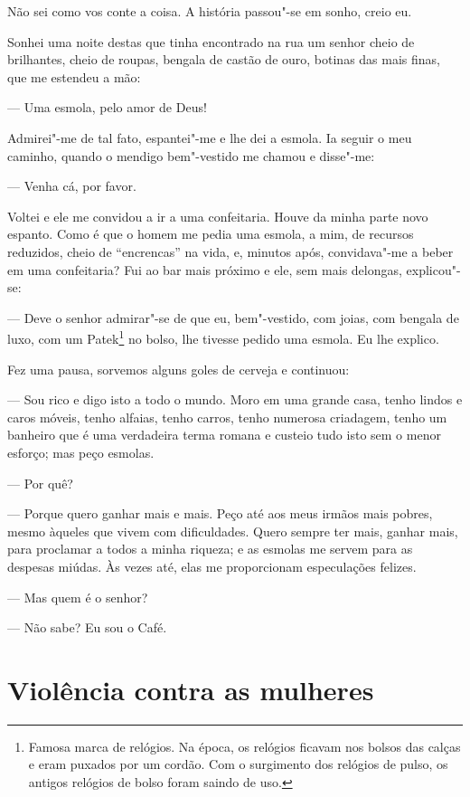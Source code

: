 Não sei como vos conte a coisa. A história passou"-se em sonho, creio eu.

Sonhei uma noite destas que tinha encontrado na rua um senhor cheio de
brilhantes, cheio de roupas, bengala de castão de ouro, botinas das mais
finas, que me estendeu a mão:

--- Uma esmola, pelo amor de Deus!

Admirei"-me de tal fato, espantei"-me e lhe dei a esmola. Ia seguir o meu
caminho, quando o mendigo bem"-vestido me chamou e disse"-me:

--- Venha cá, por favor.

Voltei e ele me convidou a ir a uma confeitaria. Houve da minha parte
novo espanto. Como é que o homem me pedia uma esmola, a mim, de recursos
reduzidos, cheio de ``encrencas'' na vida, e, minutos após, convidava"-me
a beber em uma confeitaria? Fui ao bar mais próximo e ele, sem mais
delongas, explicou"-se:

--- Deve o senhor admirar"-se de que eu, bem"-vestido, com joias, com
bengala de luxo, com um Patek\footnote{Famosa marca de relógios. Na
  época, os relógios ficavam nos bolsos das calças e eram puxados por um
  cordão. Com o surgimento dos relógios de pulso, os antigos relógios de
  bolso foram saindo de uso.} no bolso, lhe tivesse pedido uma esmola.
Eu lhe explico.

Fez uma pausa, sorvemos alguns goles de cerveja e continuou:

--- Sou rico e digo isto a todo o mundo. Moro em uma grande casa, tenho
lindos e caros móveis, tenho alfaias, tenho carros, tenho numerosa
criadagem, tenho um banheiro que é uma verdadeira terma romana e custeio
tudo isto sem o menor esforço; mas peço esmolas.

--- Por quê?

--- Porque quero ganhar mais e mais. Peço até aos meus irmãos mais
pobres, mesmo àqueles que vivem com dificuldades. Quero sempre ter mais,
ganhar mais, para proclamar a todos a minha riqueza; e as esmolas me
servem para as despesas miúdas. Às vezes até, elas me proporcionam
especulações felizes.

--- Mas quem é o senhor?

--- Não sabe? Eu sou o Café.



\part{Violência contra as mulheres}

